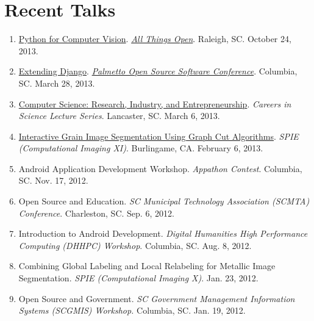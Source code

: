 \documentclass[10pt]{article}
\begin{document}
\section{Recent Talks}
{\footnotesize
\begin{enumerate}[align=left,labelsep=0em]
\renewcommand{\labelenumi}{[\arabic{enumi}]}
\item \href{http://www.malloc47.com/ato2013/}{Python for Computer Vision}. \emph{\href{http://allthingsopen.org/}{All Things Open}}. Raleigh, SC. October 24, 2013.
\item \href{http://www.malloc47.com/posscon2013/}{Extending Django}. \emph{\href{http://posscon.org/}{Palmetto Open Source Software Conference}}.  Columbia, SC.  March 28, 2013.
\item \href{http://www.malloc47.com/cs-careers/}{Computer Science: Research, Industry, and Entrepreneurship}.  \emph{Careers in Science Lecture Series}.  Lancaster, SC.  March 6, 2013.
\item \href{http://www.malloc47.com/spie2013/}{Interactive Grain Image Segmentation Using Graph Cut Algorithms}.  \emph{SPIE (Computational Imaging XI)}.  Burlingame, CA.  February 6, 2013.
\item Android Application Development Workshop.  \emph{Appathon Contest}.  Columbia, SC.  Nov. 17, 2012.
\item Open Source and Education. \emph{SC Municipal Technology Association (SCMTA) Conference}. Charleston, SC.  Sep. 6, 2012.
\item Introduction to Android Development.  \emph{Digital Humanities High Performance Computing (DHHPC) Workshop}.  Columbia, SC.  Aug. 8, 2012.
\item Combining Global Labeling and Local Relabeling for Metallic Image Segmentation.  \emph{SPIE (Computational Imaging X)}. Jan. 23, 2012.
\item Open Source and Government.  \emph{SC Government Management Information Systems (SCGMIS) Workshop.}  Columbia, SC.  Jan. 19, 2012.
\end{enumerate} }
\end{document}
